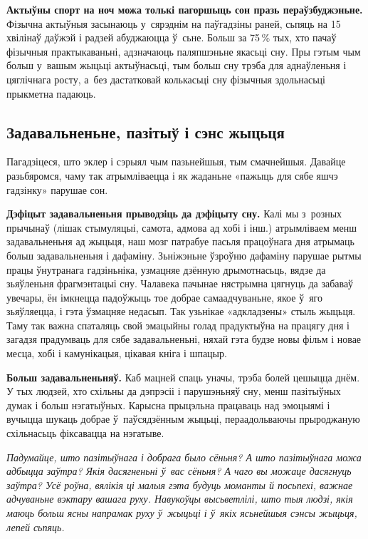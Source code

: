 \textbf{Актыўны спорт на ноч можа толькі пагоршыць сон празь пераўзбуджэньне.} Фізычна актыўныя засынаюць у~сярэднім на паўгадзіны раней, сьпяць на 15 хвілінаў даўжэй і радзей абуджаюцца ў~сьне. Больш за 75\,\% тых, хто пачаў фізычныя практыкаваньні, адзначаюць паляпшэньне якасьці сну. Пры гэтым чым больш у~вашым жыцьці актыўнасьці, тым больш сну трэба для аднаўленьня і цяглічнага росту, а~без дастатковай колькасьці сну фізычныя здольнасьці прыкметна падаюць.

\subsection*{Задавальненьне, пазітыў і сэнс жыцьця}

Пагадзіцеся, што эклер і сэрыял чым пазьнейшыя, тым смачнейшыя. Давайце разьбяромся, чаму так атрымліваецца і як жаданьне «пажыць для сябе яшчэ гадзінку» парушае сон. 

\textbf{Дэфіцыт задавальненьня прыводзіць да дэфіцыту сну.} Калі мы з~розных прычынаў (лішак стымуляцыі, самота, адмова ад хобі і інш.) атрымліваем менш задавальненьня ад жыцьця, наш мозг патрабуе пасьля працоўнага дня атрымаць больш задавальненьня і дафаміну. Зьніжэньне ўзроўню дафаміну парушае рытмы працы ўнутранага гадзіньніка, узмацняе дзённую дрымотнасьць, вядзе да зьяўленьня фрагмэнтацыі сну. Чалавека пачынае нястрымна цягнуць да забаваў увечары, ён імкнецца падоўжыць тое добрае самаадчуваньне, якое ў~яго зьяўляецца, і гэта ўзмацняе недасып. Так узьнікае «адкладзены» стыль жыцьця. Таму так важна спаталяць свой эмацыйны голад прадуктыўна на працягу дня і загадзя прадумваць для сябе задавальненьні, няхай гэта будзе новы фільм і новае месца, хобі і камунікацыя, цікавая кніга і шпацыр.


\textbf{Больш задавальненьняў.} Каб мацней спаць уначы, трэба болей цешыцца днём. У тых людзей, хто схільны да дэпрэсіі і парушэньняў сну, менш пазітыўных думак і больш нэгатыўных. Карысна прыцэльна працаваць над эмоцыямі і вучыцца шукаць добрае ў~паўсядзённым жыцьці, пераадольваючы прыроджаную схільнасьць фіксавацца на нэгатыве.

\emph{Падумайце, што пазітыўнага і добрага было сёньня? А што пазітыўнага можа адбыцца заўтра? Якія дасягненьні ў~вас сёньня? А чаго вы можаце дасягнуць заўтра? Усё роўна, вялікія ці малыя гэта будуць моманты й посьпехі, важнае адчуваньне вэктару вашага руху. Навукоўцы высьветлілі, што тыя людзі, якія маюць больш ясны напрамак руху ў~жыцьці і ў~якіх ясьнейшыя сэнсы жыцьця, лепей сьпяць.}

